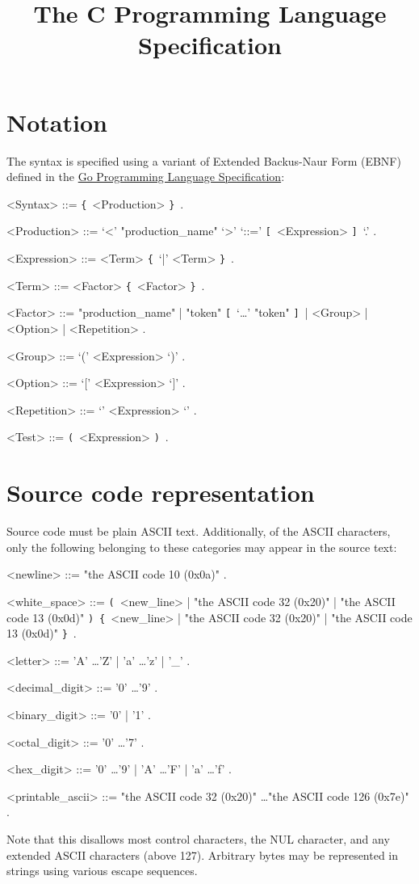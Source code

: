 \documentclass{article}
\title{The C Programming Language Specification}
\def\lrep{\synshortsoff\texttt{\{}\synshorts~}
\def\rrep{\synshortsoff\texttt{\}}\synshorts~}
\def\lopt{\synshortsoff\texttt{[}\synshorts~}
\def\ropt{\synshortsoff\texttt{]}\synshorts~}
\def\lgrp{\synshortsoff\texttt{(}\synshorts~}
\def\rgrp{\synshortsoff\texttt{)}\synshorts~}
\begin{document}
\maketitle

\section*{Notation}
The syntax is specified using a variant of Extended Backus-Naur Form (EBNF) defined in the \href{https://go.dev/ref/spec#Notation}{Go Programming Language Specification}:
\begin{grammar}
  <Syntax> ::= \lrep <Production> \rrep .
  
  <Production> ::= `<' "production_name" `>' `::=' \lopt <Expression> \ropt `.' .
  
  <Expression> ::= <Term> \lrep `|' <Term> \rrep .
  
  <Term> ::= <Factor> \lrep <Factor> \rrep .
  
  <Factor> ::= "production_name" | "token" \lopt `\ldots' "token" \ropt | <Group> | <Option> | <Repetition> .
  
  <Group> ::= `(' <Expression> `)' .
  
  <Option> ::= `[' <Expression> `]' .
  
  <Repetition> ::= `{' <Expression> `}' .

  <Test> ::= \lgrp <Expression> \rgrp .
  
\end{grammar}
\section*{Source code representation}
Source code must be plain ASCII text. Additionally, of the ASCII
characters, only the following belonging to these categories may
appear in the source text:
\begin{grammar}
  <newline> ::= "the ASCII code 10 (0x0a)" .

  <white_space> ::= \lgrp <new_line> | "the ASCII code 32 (0x20)" | "the ASCII code 13 (0x0d)" \rgrp \lrep <new_line> | "the ASCII code 32 (0x20)" | "the ASCII code 13 (0x0d)" \rrep .

  <letter> ::= 'A' \ldots 'Z' | 'a' \ldots 'z' | '_' .

  <decimal_digit> ::= '0' \ldots '9' .

  <binary_digit> ::= '0' | '1' .

  <octal_digit> ::= '0' \ldots '7' .

  <hex_digit> ::= '0' \ldots '9' | 'A' \ldots 'F' | 'a' \ldots 'f' .

  <printable_ascii> ::= "the ASCII code 32 (0x20)" \ldots "the ASCII code 126 (0x7e)" .
  
\end{grammar}
Note that this disallows most control characters, the NUL character,
and any extended ASCII characters (above 127). Arbitrary bytes may be
represented in strings using various escape sequences. %
\end{document}
